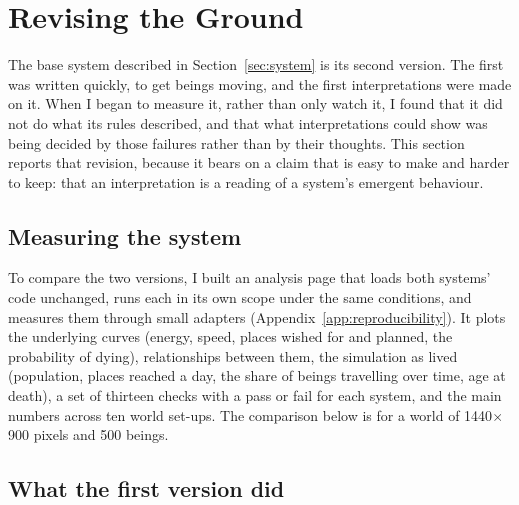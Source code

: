 \section{Revising the Ground}
\label{sec:revision}

The base system described in Section~\ref{sec:system} is its second version. The first was written quickly, to get beings moving, and the first interpretations were made on it. When I began to measure it, rather than only watch it, I found that it did not do what its rules described, and that what interpretations could show was being decided by those failures rather than by their thoughts. This section reports that revision, because it bears on a claim that is easy to make and harder to keep: that an interpretation is a reading of a system's emergent behaviour.

\subsection{Measuring the system}

To compare the two versions, I built an analysis page that loads both systems' code unchanged, runs each in its own scope under the same conditions, and measures them through small adapters (Appendix~\ref{app:reproducibility}). It plots the underlying curves (energy, speed, places wished for and planned, the probability of dying), relationships between them, the simulation as lived (population, places reached a day, the share of beings travelling over time, age at death), a set of thirteen checks with a pass or fail for each system, and the main numbers across ten world set-ups. The comparison below is for a world of 1440$\times$900 pixels and 500 beings.

\subsection{What the first version did}

